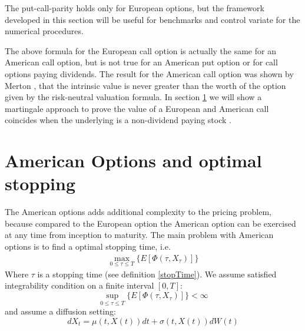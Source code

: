 The put-call-parity holds only for European options, but the framework developed in this section will be useful for benchmarks and control variate for the numerical procedures.

The above formula for the European call option is actually the same for an American call option, but is not true for an American put option or for call options paying dividends. The result for the American call option was shown by Merton \parencite{Merton73}, that the intrinsic value is never greater than the worth of the option given by the risk-neutral valuation formula. In section \ref{AmericanOptions} we will show a martingale approach to prove the value of a European and American call coincides when the underlying is a non-dividend paying stock \parencite{finKont}.


\section{American Options and optimal stopping}\label{AmericanOptions}
The American options adds additional complexity to the pricing problem, because compared to the European option the American option can be exercised at any time from inception to maturity. The main problem with American options is to find a optimal stopping time, i.e.
\begin{align}
\max_{0 \leq \tau\leq T}\{E[\Phi(\tau,X_{\tau})]\}
\end{align}
Where $\tau$ is a stopping time (see definition \ref{stopTime}).
We assume satisfied integrability condition on a finite interval $[0,T]$:
$$\sup_{0 \leq \tau\leq T}\{E[\Phi(\tau,X_\tau)]\}<\infty$$
and assume a diffusion setting:
$$dX_t=\mu(t,X(t))dt + \sigma(t,X(t))dW(t)$$

